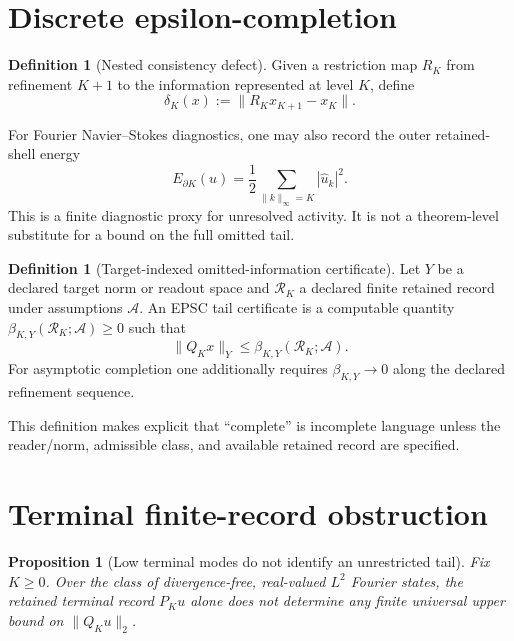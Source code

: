 \documentclass[11pt]{article}
\newtheorem{proposition}[theorem]{Proposition}
\theoremstyle{definition}
\newtheorem{definition}[theorem]{Definition}
\begin{document}
\section{Discrete epsilon-completion}

\begin{definition}[Nested consistency defect]
Given a restriction map $R_K$ from refinement $K+1$ to the information represented at level $K$,
define
\begin{equation}\label{eq:delta}
\delta_K(x):=\|R_Kx_{K+1}-x_K\|.
\end{equation}
\end{definition}

For Fourier Navier--Stokes diagnostics, one may also record the outer retained-shell energy
\begin{equation}\label{eq:boundary}
E_{\partial K}(u)=\frac12\sum_{\|k\|_\infty=K}|\widehat u_k|^2.
\end{equation}
This is a finite diagnostic proxy for unresolved activity.  It is not a theorem-level substitute
for a bound on the full omitted tail.

\begin{definition}[Target-indexed omitted-information certificate]
Let $Y$ be a declared target norm or readout space and $\mathcal R_K$ a declared finite retained
record under assumptions $\mathcal A$.  An EPSC tail certificate is a computable quantity
$\beta_{K,Y}(\mathcal R_K;\mathcal A)\ge0$ such that
\begin{equation}\label{eq:beta}
\|Q_Kx\|_Y\le \beta_{K,Y}(\mathcal R_K;\mathcal A).
\end{equation}
For asymptotic completion one additionally requires $\beta_{K,Y}\to0$ along the declared
refinement sequence.
\end{definition}

This definition makes explicit that ``complete'' is incomplete language unless the reader/norm,
admissible class, and available retained record are specified.

\section{Terminal finite-record obstruction}

\begin{proposition}[Low terminal modes do not identify an unrestricted tail]\label{prop:nogo}
Fix $K\ge0$.  Over the class of divergence-free, real-valued $L^2$ Fourier states, the retained
terminal record $P_Ku$ alone does not determine any finite universal upper bound on
$\|Q_Ku\|_2$.
\end{proposition}
\end{document}
